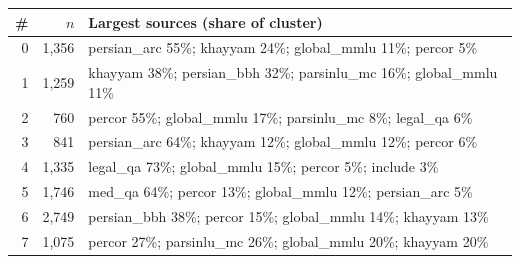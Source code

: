 \begin{tabular}{rr>{\raggedright\arraybackslash}p{10cm}}
\toprule
\# & $n$ & Largest sources (share of cluster) \\
\midrule
0 & 1,356 & \footnotesize persian\_arc 55\%; khayyam 24\%; global\_mmlu 11\%; percor 5\% \\
1 & 1,259 & \footnotesize khayyam 38\%; persian\_bbh 32\%; parsinlu\_mc 16\%; global\_mmlu 11\% \\
2 & 760 & \footnotesize percor 55\%; global\_mmlu 17\%; parsinlu\_mc 8\%; legal\_qa 6\% \\
3 & 841 & \footnotesize persian\_arc 64\%; khayyam 12\%; global\_mmlu 12\%; percor 6\% \\
4 & 1,335 & \footnotesize legal\_qa 73\%; global\_mmlu 15\%; percor 5\%; include 3\% \\
5 & 1,746 & \footnotesize med\_qa 64\%; percor 13\%; global\_mmlu 12\%; persian\_arc 5\% \\
6 & 2,749 & \footnotesize persian\_bbh 38\%; percor 15\%; global\_mmlu 14\%; khayyam 13\% \\
7 & 1,075 & \footnotesize percor 27\%; parsinlu\_mc 26\%; global\_mmlu 20\%; khayyam 20\% \\
\bottomrule
\end{tabular}
